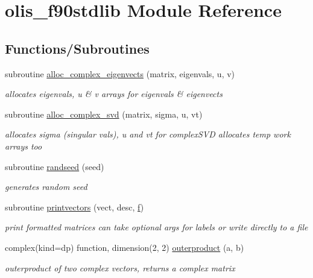 \hypertarget{namespaceolis__f90stdlib}{}\section{olis\+\_\+f90stdlib Module Reference}
\label{namespaceolis__f90stdlib}
\subsection*{Functions/\+Subroutines}
\begin{DoxyCompactItemize}
\item 
subroutine \hyperlink{namespaceolis__f90stdlib_af0119bd404337367bc0727decf6dd89c}{alloc\+\_\+complex\+\_\+eigenvects} (matrix, eigenvals, u, v)
\begin{DoxyCompactList}\small\item\em allocates eigenvals, u \& v arrays for eigenvals \& eigenvects \end{DoxyCompactList}\item 
subroutine \hyperlink{namespaceolis__f90stdlib_a31420ff7579f33919c00c26753b56612}{alloc\+\_\+complex\+\_\+svd} (matrix, sigma, u, vt)
\begin{DoxyCompactList}\small\item\em allocates sigma (singular vals), u and vt for complex\+S\+VD  allocates temp work arrays too \end{DoxyCompactList}\item 
subroutine \hyperlink{namespaceolis__f90stdlib_a560e235cbabaf74da88a2ec97eda5628}{randseed} (seed)
\begin{DoxyCompactList}\small\item\em generates random seed \end{DoxyCompactList}\item 
subroutine \hyperlink{namespaceolis__f90stdlib_a9780b39329025edfdef71ce07e250808}{printvectors} (vect, desc, \hyperlink{num__hom_8f90_a2ea4612463aead6dff28d647f3800909}{f})
\begin{DoxyCompactList}\small\item\em print formatted matrices  can take optional args for labels or write directly to a file \end{DoxyCompactList}\item 
complex(kind=dp) function, dimension(2, 2) \hyperlink{namespaceolis__f90stdlib_a9b646e61678500e78a9c48747a07bdf0}{outerproduct} (a, b)
\begin{DoxyCompactList}\small\item\em outerproduct of two complex vectors, returns a complex matrix \end{DoxyCompactList}\item 

\end{DoxyCompactItemize}
